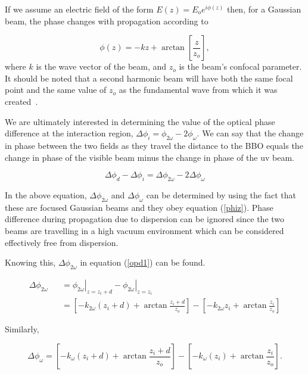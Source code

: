 If we assume an electric field of the form $E(z)=E_oe^{i\phi(z)}$
then, for a Gaussian beam, the phase changes with propagation
according to~\cite{Verdeyen}

\begin{equation}\label{phiz}
\phi(z)=-kz+\arctan{\left[\frac{z}{z_o}\right]},
\end{equation} where $k$ is the wave vector of the beam, and $z_o$ is the beam's
confocal parameter. It should be noted that a second harmonic beam
will have both the same focal point and the same value of $z_o$ as
the fundamental wave from which it was created~\cite{Kleinman}.

We are ultimately interested in determining the value of the
optical phase difference at the interaction region,
$\Delta\phi_{i}=\phi_{2\omega}-2\phi_\omega$.  We can say that the
change in phase between the two fields as they travel the distance
to the BBO equals the change in phase of the visible beam minus
the change in phase of the uv beam.

\begin{equation}\label{opd1}
\Delta\phi_d-\Delta\phi_{i}=\Delta\phi_{2\omega}-2\Delta\phi_\omega
\end{equation}

In the above equation, $\Delta\phi_{2\omega}$ and
$\Delta\phi_\omega$ can be determined by using the fact that these
are focused Gaussian beams and they obey equation (\ref{phiz}).
Phase difference during propagation due to dispersion can be
ignored since the two beams are travelling in a high vacuum
environment which can be considered effectively free from
dispersion.

Knowing this, $\Delta\phi_{2\omega}$ in equation (\ref{opd1}) can
be found.

\begin{eqnarray}
\Delta\phi_{2\omega}& & = \left. \phi_{2\omega} \right|_{z=z_i+d} - \left. \phi_{2\omega} \right|_{z=z_i} \\
& & = \left[ -k_{2\omega}(z_i+d)+\arctan{\frac{z_i+d}{z_o}}
\right] - \left[ -k_{2\omega}z_i+\arctan{\frac{z_i}{z_o}} \right]
\label{opd2}
\end{eqnarray}

Similarly,

\begin{equation}\label{opd3}
\Delta\phi_\omega = \left[
-k_{\omega}(z_i+d)+\arctan{\frac{z_i+d}{z_o}} \right] - \left[
-k_{\omega}(z_i)+\arctan{\frac{z_i}{z_o}} \right].
\end{equation}

